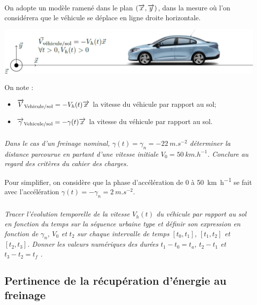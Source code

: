 \documentclass[10pt,fleqn]{article} %
\begin{document}
\begin{multicols}{2}
On adopte un modèle ramené dans le plan $\left(\overrightarrow{x},\overrightarrow{y}\right)$, dans la mesure où l’on considérera que le véhicule se déplace en ligne droite horizontale.

\begin{center}
\includegraphics[width=\linewidth]{images/fig_02}

\end{center}

On note :
\begin{itemize}
\item $\overrightarrow{V}_{\text{Vehicule/sol}} = -V_h(t)\overrightarrow{x}$ la vitesse du véhicule par rapport au sol;
\item $\overrightarrow{\gamma}_{\text{Vehicule/sol}} = -\gamma(t)\overrightarrow{x}$ la vitesse du véhicule par rapport au sol.
\end{itemize}

\subparagraph{}\textit{Dans le cas d'un freinage nominal, $\gamma(t)=\gamma_n=-2\SI{2}{m.s^{-2}}$ déterminer la distance parcourue en partant d'une vitesse initiale $V_0=\SI{50}{km.h^{-1}}$. Conclure au regard des critères du cahier des charges.}
\ifprof
\begin{corrige}
\end{corrige}
\else
\fi


Pour simplifier, on considère que la phase d’accélération de 0 à \SI{50}{km.h^{-1}} se fait avec l’accélération $\gamma(t)=-\gamma_n = \SI{2}{m.s^{-2}}$. 


\subparagraph{}\textit{Tracer l’évolution temporelle de la vitesse $V_h(t)$ du véhicule par rapport au sol en fonction du temps sur la séquence urbaine type et définir son expression en fonction de $\gamma_n$, $V_0$ et $t_2$ sur chaque intervalle de temps $[t_0, t_1]$, $[t_1, t_2]$ et $[t_2, t_3]$. Donner les valeurs numériques des durées $t_1 -t_0 = t_a$, $t_2 - t_1$ et $t_3 - t_2 = t_f$ .}
\ifprof
\begin{corrige}
\end{corrige}
\else
\fi

\subsection*{Pertinence de la récupération d’énergie au freinage}


\end{multicols}
\end{document}
